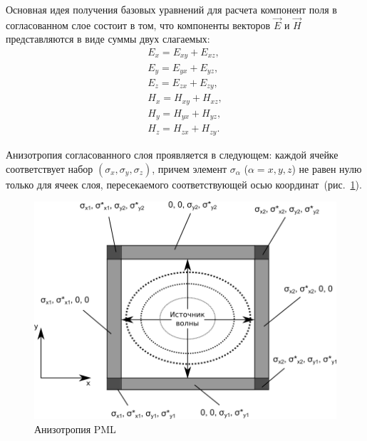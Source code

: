 Основная идея получения базовых уравнений для расчета компонент поля
в согласованном слое состоит в том, что компоненты векторов $\vec{E}$
и $\vec{H}$ представляются в виде суммы двух слагаемых:
\begin{align*}
    E_x = E_{xy}+E_{xz}, \\
    E_y = E_{yx}+E_{yz}, \\
    E_z = E_{zx}+E_{zy}, \\
    H_x = H_{xy}+H_{xz}, \\
    H_y = H_{yx}+H_{yz}, \\
    H_z = H_{zx}+H_{zy}.
\end{align*}

Анизотропия согласованного слоя проявляется в следующем: каждой ячейке соответствует набор $(\sigma_x,\sigma_y,\sigma_z)$, причем элемент $\sigma_\alpha$ ($\alpha={x,y,z}$) не равен нулю только для ячеек слоя, пересекаемого соответствующей осью координат~(рис.~\ref{fig:PML}).

\afterpage{\clearpage}
\begin{figure}[p]
\centering
\includegraphics[width=1\textwidth]{include/graphics/image4195}
\caption{Анизотропия PML}
\label{fig:PML}
\end{figure}

